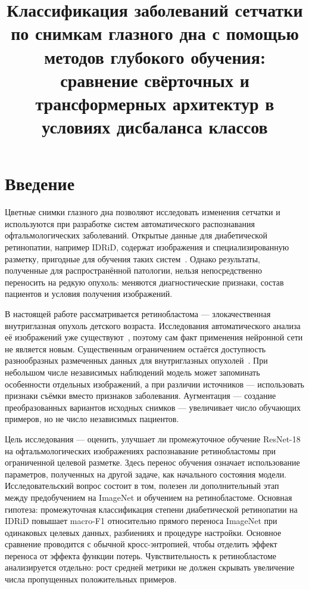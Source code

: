 \documentclass{misisarticle}
\title{Классификация заболеваний сетчатки по снимкам глазного дна с помощью методов глубокого обучения: сравнение свёрточных и трансформерных архитектур в условиях дисбаланса классов }
\begin{document}
\maketitle

\section{Введение}
Цветные снимки глазного дна позволяют исследовать изменения сетчатки и используются при разработке систем автоматического распознавания офтальмологических заболеваний. Открытые данные для диабетической ретинопатии, например IDRiD, содержат изображения и специализированную разметку, пригодные для обучения таких систем~\cite{idrid}. Однако результаты, полученные для распространённой патологии, нельзя непосредственно переносить на редкую опухоль: меняются диагностические признаки, состав пациентов и условия получения изображений.

В настоящей работе рассматривается ретинобластома --- злокачественная внутриглазная опухоль детского возраста. Исследования автоматического анализа её изображений уже существуют~\cite{kaliki2023}, поэтому сам факт применения нейронной сети не является новым. Существенным ограничением остаётся доступность разнообразных размеченных данных для внутриглазных опухолей~\cite{sun2025}. При небольшом числе независимых наблюдений модель может запоминать особенности отдельных изображений, а при различии источников --- использовать признаки съёмки вместо признаков заболевания. Аугментация --- создание преобразованных вариантов исходных снимков --- увеличивает число обучающих примеров, но не число независимых пациентов.

Цель исследования --- оценить, улучшает ли промежуточное обучение ResNet-18 на офтальмологических изображениях распознавание ретинобластомы при ограниченной целевой разметке. Здесь перенос обучения означает использование параметров, полученных на другой задаче, как начального состояния модели. Исследовательский вопрос состоит в том, полезен ли дополнительный этап между предобучением на ImageNet и обучением на ретинобластоме. Основная гипотеза: промежуточная классификация степени диабетической ретинопатии на IDRiD повышает macro-F1 относительно прямого переноса ImageNet при одинаковых целевых данных, разбиениях и процедуре настройки. Основное сравнение проводится с обычной кросс-энтропией, чтобы отделить эффект переноса от эффекта функции потерь. Чувствительность к ретинобластоме анализируется отдельно: рост средней метрики не должен скрывать увеличение числа пропущенных положительных примеров.
\end{document}
